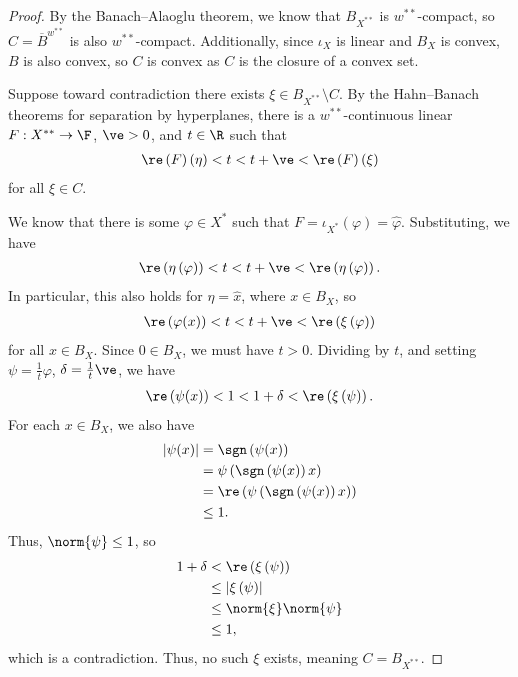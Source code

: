 \documentclass[10pt]{mypackage}
\begin{document}
\begin{proof}
  By the Banach--Alaoglu theorem, we know that $B_{X^{\ast\ast}}$ is $w^{\ast\ast}$-compact, so $C = \overline{B}^{w^{\ast\ast}}$ is also $w^{\ast\ast}$-compact. Additionally, since $\iota_X$ is linear and $B_{X}$ is convex, $B$ is also convex, so $C$ is convex as $C$ is the closure of a convex set.\newline

  Suppose toward contradiction there exists $\xi \in B_{X^{\ast\ast}}\setminus C$. By the Hahn--Banach theorems for separation by hyperplanes, there is a $w^{\ast\ast}$-continuous linear $F: X^{\ast\ast}\rightarrow \F$, $\ve > 0$, and $t\in \R$ such that
  \begin{align*}
    \re\left(F\right)\left(\eta\right) < t < t + \ve < \re\left(F\right)\left(\xi\right)
  \end{align*}
  for all $\xi\in C$.\newline

  We know that there is some $\varphi\in X^{\ast}$ such that $F = \iota_{X^{\ast}}\left(\varphi\right) = \hat{\varphi}$. Substituting, we have
  \begin{align*}
    \re\left(\eta\left(\varphi\right)\right) < t < t + \ve < \re\left(\eta\left(\varphi\right)\right).
  \end{align*}
  In particular, this also holds for $\eta = \hat{x}$, where $x\in B_X$, so
  \begin{align*}
    \re\left(\varphi(x)\right) < t < t + \ve < \re\left(\xi\left(\varphi\right)\right)
  \end{align*}
  for all $x\in B_X$. Since $0 \in B_X$, we must have $t > 0$. Dividing by $t$, and setting $\psi = \frac{1}{t}\varphi$, $\delta = \frac{1}{t}\ve$, we have
  \begin{align*}
    \re\left(\psi(x)\right) < 1 < 1 + \delta < \re\left(\xi\left(\psi\right)\right).
  \end{align*}
  For each $x\in B_X$, we also have
  \begin{align*}
    \left\vert \psi(x) \right\vert &= \sgn\left(\psi(x)\right)\\
                                   &= \psi\left(\sgn\left(\psi(x)\right)x\right)\\
                                   &= \re\left(\psi\left(\sgn\left(\psi(x)\right)x\right)\right)\\
                                   &\leq 1.
  \end{align*}
  Thus, $\norm{\psi} \leq 1$, so
  \begin{align*}
    1 + \delta &< \re\left(\xi\left(\psi\right)\right)\\
               &\leq \left\vert \xi\left(\psi\right) \right\vert\\
               &\leq \norm{\xi}\norm{\psi}\\
               &\leq 1,
  \end{align*}
  which is a contradiction. Thus, no such $\xi$ exists, meaning $C = B_{X^{\ast\ast}}$.
\end{proof}
\end{document}
